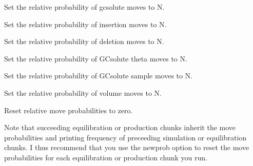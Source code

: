 \documentclass[letterpaper,10pt,english]{sphinxmanual}
\begin{document}
Set the relative probability of gcsolute moves to N.

%
\begin{sphinxVerbatim}[commandchars=\\\{\}]
\end{sphinxVerbatim}

Set the relative probability of insertion moves to N.

%
\begin{sphinxVerbatim}[commandchars=\\\{\}]
\end{sphinxVerbatim}

Set the relative probability of deletion moves to N.

%
\begin{sphinxVerbatim}[commandchars=\\\{\}]
\end{sphinxVerbatim}

Set the relative probability of GCsolute theta moves to N.

%
\begin{sphinxVerbatim}[commandchars=\\\{\}]
\end{sphinxVerbatim}

Set the relative probability of GCsolute sample moves to N.

%
\begin{sphinxVerbatim}[commandchars=\\\{\}]
\end{sphinxVerbatim}

Set the relative probability of volume moves to N.

%
\begin{sphinxVerbatim}[commandchars=\\\{\}]
\end{sphinxVerbatim}

Reset relative move probabilities to zero.

Note that succeeding equilibration or production chunks inherit the move probabilities and printing frequency of preceeding simulation or equilibration chunks. I thus recommend that you use the newprob option to reset the move probabilities for each equilibration or production chunk you run.
\end{document}
